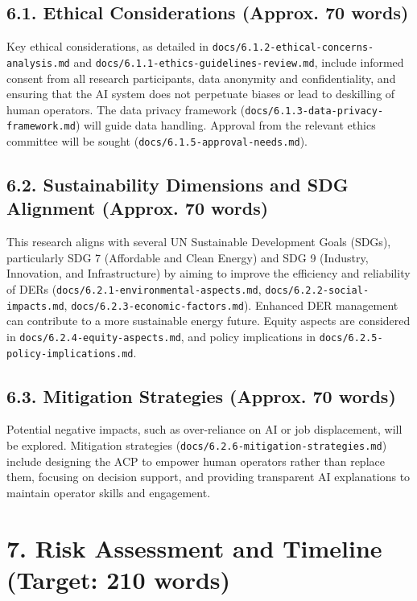 \documentclass[12pt,a4paper]{article}
\begin{document}
\begin{itemize}
\begin{itemize}
\begin{itemize}
\begin{itemize}
\begin{itemize}
\begin{itemize}
\subsection{6.1. Ethical Considerations (Approx. 70 words)}
Key ethical considerations, as detailed in \texttt{docs/6.1.2-ethical-concerns-analysis.md} and \texttt{docs/6.1.1-ethics-guidelines-review.md}, include informed consent from all research participants, data anonymity and confidentiality, and ensuring that the AI system does not perpetuate biases or lead to deskilling of human operators. The data privacy framework (\texttt{docs/6.1.3-data-privacy-framework.md}) will guide data handling. Approval from the relevant ethics committee will be sought (\texttt{docs/6.1.5-approval-needs.md}).

\subsection{6.2. Sustainability Dimensions and SDG Alignment (Approx. 70 words)}
This research aligns with several UN Sustainable Development Goals (SDGs), particularly SDG 7 (Affordable and Clean Energy) and SDG 9 (Industry, Innovation, and Infrastructure) by aiming to improve the efficiency and reliability of DERs (\texttt{docs/6.2.1-environmental-aspects.md}, \texttt{docs/6.2.2-social-impacts.md}, \texttt{docs/6.2.3-economic-factors.md}). Enhanced DER management can contribute to a more sustainable energy future. Equity aspects are considered in \texttt{docs/6.2.4-equity-aspects.md}, and policy implications in \texttt{docs/6.2.5-policy-implications.md}.

\subsection{6.3. Mitigation Strategies (Approx. 70 words)}
Potential negative impacts, such as over-reliance on AI or job displacement, will be explored. Mitigation strategies (\texttt{docs/6.2.6-mitigation-strategies.md}) include designing the ACP to empower human operators rather than replace them, focusing on decision support, and providing transparent AI explanations to maintain operator skills and engagement.

\section{7. Risk Assessment and Timeline (Target: 210 words)}


\end{itemize}
\end{itemize}
\end{itemize}
\end{itemize}
\end{itemize}
\end{itemize}
\end{document}
